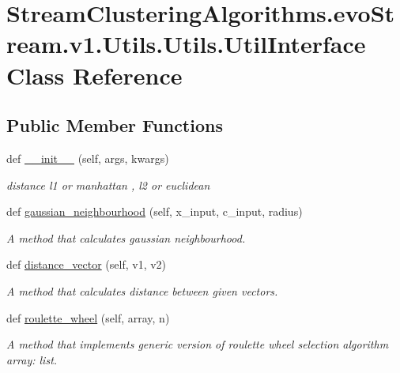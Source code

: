 \hypertarget{classStreamClusteringAlgorithms_1_1evoStream_1_1v1_1_1Utils_1_1Utils_1_1UtilInterface}{}\section{Stream\+Clustering\+Algorithms.\+evo\+Stream.\+v1.\+Utils.\+Utils.\+Util\+Interface Class Reference}
\label{classStreamClusteringAlgorithms_1_1evoStream_1_1v1_1_1Utils_1_1Utils_1_1UtilInterface}
\subsection*{Public Member Functions}
\begin{DoxyCompactItemize}
\item 
def \hyperlink{classStreamClusteringAlgorithms_1_1evoStream_1_1v1_1_1Utils_1_1Utils_1_1UtilInterface_a1da0b7cc382fe2d4de73ce2d9bf0ee50}{\+\_\+\+\_\+init\+\_\+\+\_\+} (self, args, kwargs)
\begin{DoxyCompactList}\small\item\em distance l1 or manhattan , l2 or euclidean \end{DoxyCompactList}\item 
def \hyperlink{classStreamClusteringAlgorithms_1_1evoStream_1_1v1_1_1Utils_1_1Utils_1_1UtilInterface_ac30db0e22295e7744b5dee7f5162c0bd}{gaussian\+\_\+neighbourhood} (self, x\+\_\+input, c\+\_\+input, radius)
\begin{DoxyCompactList}\small\item\em A method that calculates gaussian neighbourhood. \end{DoxyCompactList}\item 
def \hyperlink{classStreamClusteringAlgorithms_1_1evoStream_1_1v1_1_1Utils_1_1Utils_1_1UtilInterface_afe042d374b769576ab1d7b88383e229a}{distance\+\_\+vector} (self, v1, v2)
\begin{DoxyCompactList}\small\item\em A method that calculates distance between given vectors. \end{DoxyCompactList}\item 
def \hyperlink{classStreamClusteringAlgorithms_1_1evoStream_1_1v1_1_1Utils_1_1Utils_1_1UtilInterface_a213dc197427bc02dbbf5d6f01310a853}{roulette\+\_\+wheel} (self, array, n)
\begin{DoxyCompactList}\small\item\em A method that implements generic version of roulette wheel selection algorithm  array\+: list. \end{DoxyCompactList}\item 

\end{DoxyCompactItemize}
